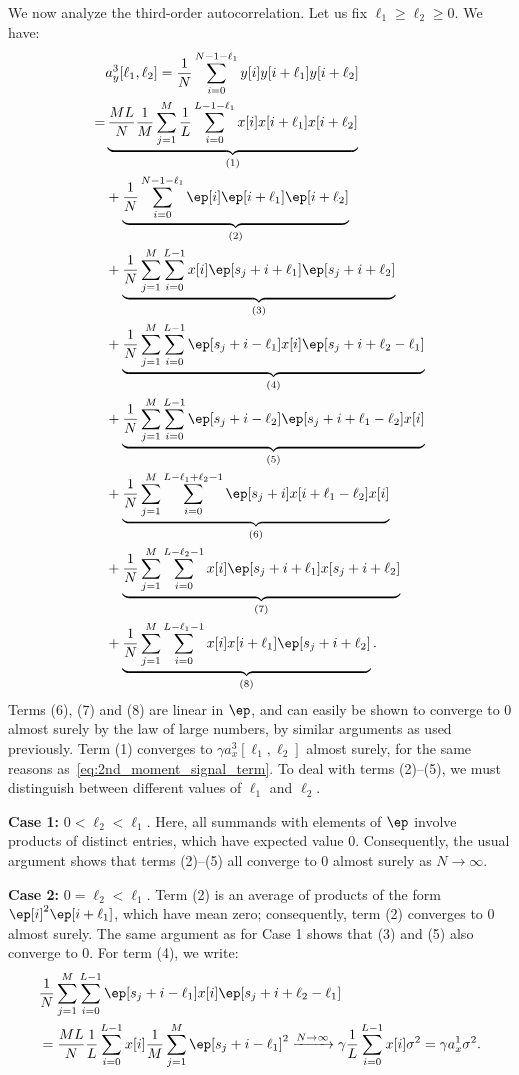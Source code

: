 \documentclass[9pt,twocolumn,twoside,lineno]{pnas-new}
\begin{document}
We now analyze the third-order autocorrelation. Let us fix $\ell_1\geq\ell_2\ge0$. We have:
%
\begin{align}
%
&a_y^3[\ell_1,\ell_2] 
= \frac{1}{N}\sum_{i=0}^{N-1-\ell_1} y[i]y[i+\ell_1]y[i+\ell_2]
\nonumber \\
%
=& \underbrace{ \frac{ML}{N}\frac{1}{M}\sum_{j=1}^M 
	\frac{1}{L}\sum_{i=0}^{L-1-\ell_1}x[i]x[i+\ell_1]x[i+\ell_2]   }_{(1)}
\\& + \underbrace{\frac{1}{N}\sum_{i=0}^{N-1-\ell_1} \ep[i]\ep[i+\ell_1]\ep[i+\ell_2]}_{(2)}
\nonumber \\
&+ \underbrace{\frac{1}{N}\sum_{j=1}^{M} 
	\sum_{i=0}^{L-1} x[i]\ep[s_j + i+\ell_1]\ep[s_j+ i+\ell_2]}_{(3)}
\\& + \underbrace{\frac{1}{N}\sum_{j=1}^{M} 
	\sum_{i=0}^{L-1} \ep[s_j+i-\ell_1]x[i]\ep[s_j+ i+\ell_2-\ell_1]}_{(4)}
\nonumber \\
&+ \underbrace{\frac{1}{N}\sum_{j=1}^{M} 
	\sum_{i=0}^{L-1} \ep[s_j+i-\ell_2]\ep[s_j+i+\ell_1-\ell_2]x[i]}_{(5)}
\\ & + \underbrace{\frac{1}{N}\sum_{j=1}^{M} 
	\sum_{i=0}^{L-\ell_1+\ell_2-1} \ep[s_j+i]x[i+\ell_1-\ell_2]x[i]}_{(6)}
\nonumber \\
&+ \underbrace{\frac{1}{N}\sum_{j=1}^{M} 
	\sum_{i=0}^{L-\ell_2-1} x[i]\ep[s_j + i+\ell_1]x[s_j+ i+\ell_2]}_{(7)}
\\ & + \underbrace{\frac{1}{N}\sum_{j=1}^{M} 
	\sum_{i=0}^{L-\ell_1-1} x[i]x[i+\ell_1]\ep[s_j+ i+\ell_2]}_{(8)}.
%
\end{align}
%
Terms (6), (7) and (8) are linear in $\ep$, and can easily be shown to converge to 0 almost surely by the law of large numbers, by similar arguments as used previously. Term (1) converges to $\gamma a_x^3[\ell_1,\ell_2]$ almost surely, for the same reasons as~\eqref{eq:2nd_moment_signal_term}. To deal with terms (2)--(5), we must distinguish between different values of $\ell_1$ and $\ell_2$.

{\bf Case 1:} $0 < \ell_2 < \ell_1$. Here, all summands with elements of $\ep$ involve products of distinct entries, which have expected value 0. Consequently, the usual argument shows that terms (2)--(5) all converge to 0 almost surely as $N \to \infty$.

{\bf Case 2:} $0=\ell_2 < \ell_1$. Term (2) is an average of products of the form $\ep[i]^2\ep[i+\ell_1]$, which have mean zero; consequently, term (2) converges to 0 almost surely. The same argument as for Case 1 shows that (3) and (5) also converge to 0. For term (4), we write:
%
\begin{align}
%
&\frac{1}{N}\sum_{j=1}^{M} 
\sum_{i=0}^{L-1} \ep[s_j+i-\ell_1]x[i]\ep[s_j+ i+\ell_2-\ell_1]
\nonumber \\
&= \frac{ML}{N}\frac{1}{L}\sum_{i=0}^{L-1}x[i] \frac{1}{M}\sum_{j=1}^{M} \ep[s_j+i-\ell_1]^2
\xrightarrow{N\to\infty} \gamma \frac{1}{L} \sum_{i=0}^{L-1}x[i] \sigma^2 = \gamma a_x^1 \sigma^2.
%
\end{align}
\end{document}
